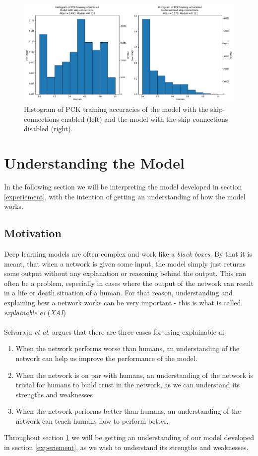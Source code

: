 \documentclass[./main.tex]{subfiles}
\begin{document}
\begin{figure}[t]
    \centering
    \includegraphics[height = 6 cm]{entities/PCK_accs_vs.png}
    \caption{Histogram of PCK training accuracies of the model with the skip-connections enabled (left) and the model with the skip connections disabled (right).}
    \label{fig:PCK_accs}
\end{figure}

\section{Understanding the Model}\label{sec:XAI}
In the following section we will be interpreting the model developed in section \ref{experiement}, with the intention of getting an understanding of how the model works.

\subsection{Motivation}
Deep learning models are often complex and work like a \textit{black boxes}. By that it is meant, that when a network is given some input, the model simply just returns some output without any explanation or reasoning behind the output. This can often be a problem, especially in cases where the output of the network can result in a life or death situation of a human. For that reason, understanding and explaining how a network works can be very important - this is what is called \textit{explainable ai} (\textit{XAI}) 
\\
\\
Selvaraju \textit{et al.} \cite{Selvaraju} argues that there are three cases for using explainable ai:
\begin{enumerate}
    \item When the network performs worse than humans, an understanding of the network can help us improve the performance of the model.
    \item When the network is on par with humans, an understanding of the network is trivial for humans to build trust in the network, as we can understand its strengths and weaknesses
    \item When the network performs better than humans, an understanding of the network can teach humans how to perform better.
\end{enumerate}
Throughout section \ref{sec:XAI} we will be getting an understanding of our model developed in section \ref{experiement}, as we wish to understand its strengths and weaknesses.
\end{document}
